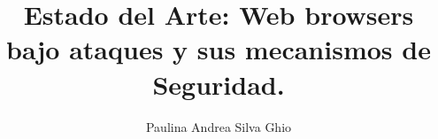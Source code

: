 \documentclass[letterpaper,oneside,12pt,spanish]{book}
\title{Estado del Arte: Web browsers bajo ataques y sus mecanismos de Seguridad.}
\author{Paulina Andrea Silva Ghio}
\begin{document}
\frontmatter
 

\newpage 
 
\newpage 
 
\markboth{}{}
\newpage
\tableofcontents 
\newpage
\renewcommand{\sectionmark}[1]{\markright{\thesection\ #1}}

\mainmatter

\newpage

\newpage

\newpage

\newpage

\newpage

\newpage





\appendix

%
\end{document}

